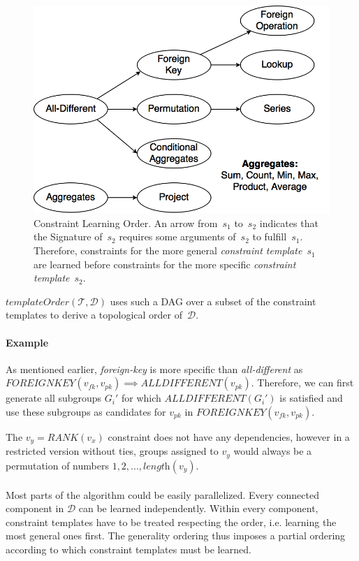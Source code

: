 \documentclass{sig-alternate-05-2015}
\newcommand{\constraints}{\ensuremath{\mathcal{T}}\xspace}
\newcommand{\format}[1]{\textit{#1}\xspace}
\newcommand{\constrainttorder}{\format{templateOrder}}
\newcommand{\template}{\format{constraint template}}
\newcommand{\CSignature}{Signature\xspace}
\newcommand{\dependencies}{\ensuremath{\mathcal{D}}\xspace}
\newcommand{\eccalc}[2]{\ensuremath{#1 = #2}}
\newcommand{\ecrank}[2]{\eccalc{#1}{\mathit{RANK}(#2)}}
\newcommand{\ecfkey}[2]{\ensuremath{FOREIGNKEY(#1,#2)}}
\newcommand{\ecalldiff}[1]{\ensuremath{\mathit{ALLDIFFERENT}(#1)}}
\begin{document}
\begin{figure}[tbh]
  \centering
  \includegraphics[width=0.9\linewidth]{figures/constraint_dependency.png}
  \caption{Constraint Learning Order.
  An arrow from~$s_1$ to~$s_2$ indicates that the \CSignature of~$s_2$ requires some arguments of~$s_2$ to fulfill~$s_1$.
  Therefore, constraints for the more general \template~$s_1$ are learned before constraints for the more specific \template~$s_2$.
  }
  \label{fig:learning_order}
\end{figure}

$\constrainttorder(\constraints,\dependencies)$ uses such a DAG over a subset of the constraint templates to derive a topological order of~\dependencies.

\paragraph{Example}
As mentioned earlier, \textit{foreign-key} is more specific than \textit{all-different} as $\ecfkey{v_{fk}}{v_{pk}} \implies \ecalldiff{v_{pk}}$.
Therefore, we can first generate all subgroups $G_i'$ for which \ecalldiff{G_i'} is satisfied and use these subgroups as candidates for $v_{pk}$ in \ecfkey{v_{fk}}{v_{pk}}.

The \ecrank{v_y}{v_x} constraint does not have any dependencies, however in a restricted version without ties, groups assigned to $v_y$ would always be a permutation of numbers $1, 2, ..., \textit{length}(v_y)$.
\\\\
Most parts of the algorithm could be easily parallelized.
Every connected component in \dependencies can be learned independently.
Within every component, constraint templates have to be treated respecting the order, i.e. learning the most general ones first.
The generality ordering thus imposes a partial ordering according to which constraint templates must be learned.
\end{document}
